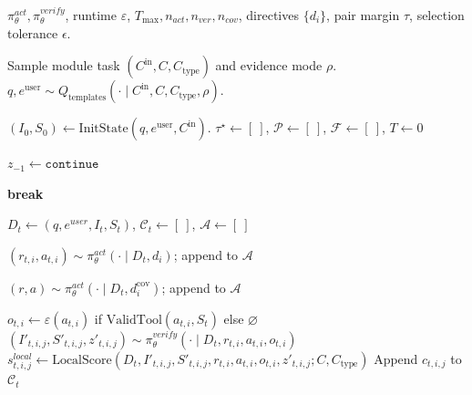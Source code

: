 \documentclass[thesis,letterpaper,12pt]{utthesis}
\begin{document}
\begin{algorithm}
\caption{Trajectory Generation for SFT and DPO}\label{alg:trajectory-gen}
\begin{algorithmic}
    \Require $\pi^{act}_\theta, \pi^{verify}_\theta$, runtime $\varepsilon$, $T_{\max}, n_{act}, n_{ver}, n_{cov}$, directives $\{d_i\}$, pair margin $\tau$, selection tolerance $\epsilon$.

    \State Sample module task $(C^\text{in}, C, C_\text{type})$ and evidence mode $\rho$.
    \State $q, e^\text{user} \sim Q_\text{templates}(\cdot \mid C^\text{in}, C, C_\text{type}, \rho)$.
    
    \State $(I_0, S_0) \gets \mathrm{InitState}(q, e^\text{user}, C^\text{in})$.
    \State $\tau^\star \gets [\ ]$, \quad $\mathcal{P} \gets [\ ]$, \quad $\mathcal{F} \gets [\ ]$, \quad $T \gets 0$
    
    \State $z_{-1} \gets \texttt{continue}$

         \textbf{break} \EndIf
        
        \State $D_t \gets (q, e^{user}, I_t, S_t)$, \quad $\mathcal{C}_t \gets [\ ]$, \quad $\mathcal{A} \gets [\ ]$
        
            \State $(r_{t,i}, a_{t,i}) \sim \pi^{act}_\theta(\cdot \mid D_t, d_i)$; \quad append to $\mathcal{A}$
        \EndFor
        
                \State $(r, a) \sim \pi^{act}_\theta(\cdot \mid D_t, d^{\text{cov}}_i)$; \quad append to $\mathcal{A}$
            \EndFor
        \EndIf

            \State $o_{t,i} \gets \varepsilon(a_{t,i})$ if $\mathrm{ValidTool}(a_{t,i}, S_t)$ else $\varnothing$
               \State $(I'_{t,i,j}, S'_{t,i,j}, z'_{t,i,j}) \sim \pi^{verify}_\theta(\cdot \mid D_t, r_{t,i}, a_{t,i}, o_{t,i})$
               \State $s^{local}_{t,i,j} \gets \mathrm{LocalScore}(D_t, I'_{t,i,j}, S'_{t,i,j}, r_{t,i}, a_{t,i}, o_{t,i}, z'_{t,i,j}; C, C_{\text{type}})$
               \State Append $c_{t,i,j}$ to $\mathcal{C}_t$
            \EndFor
        \EndFor


\end{algorithmic}
\end{algorithm}
\end{document}
